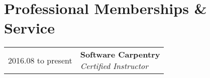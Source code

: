 \documentclass[11pt,letter,sans]{moderncv}
\makeatletter
\newenvironment{entrylistThree}{%
  \begin{tabular*}{\textwidth}{@{\extracolsep{\fill}}ll}
}{%
  \end{tabular*}
}
\newcommand{\entryThree}[3]{%
  #1&\parbox[t]{127mm}{%
    \textbf{#2}\\%
    \textit{#3}\vspace{\parsep}%
  }\\}
\makeatother
\begin{document}
\section{Professional Memberships \& Service}
\begin{entrylistThree}
\entryThree
{2016.08 to present}
{Software Carpentry}
{Certified Instructor}
\entryThree
{2016.01 to present}
{NHGRI Preprint Journal Club}
{Organizer}
\entryThree
{2016.01, 2016.08, 2016.10}
{NCBI Hackathons}
{Team Lead}
\entryThree
{2013.09 to 2015.09}
{International Mammalian Genome Society}
{Secretariat member (honorary)}
\entryThree
{2013.08}
{UNC Genetics Department Retreat}
{Abstract Review Committee}
\end{entrylistThree}
\end{document}
